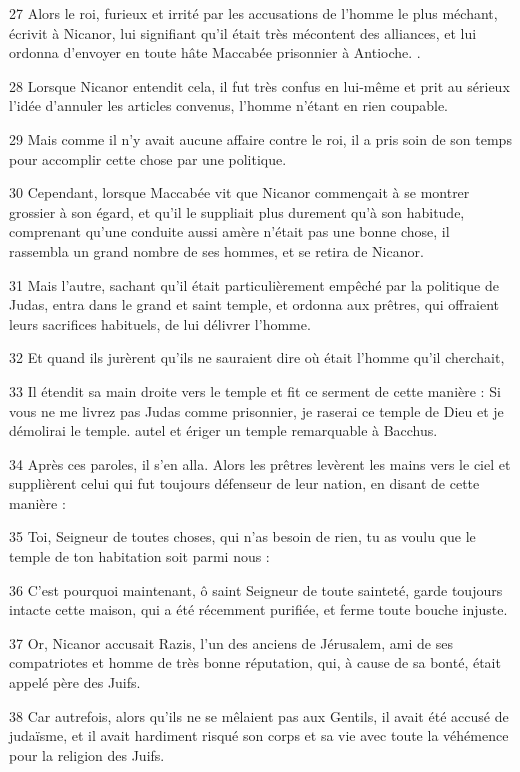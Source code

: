 \par 27 Alors le roi, furieux et irrité par les accusations de l'homme le plus méchant, écrivit à Nicanor, lui signifiant qu'il était très mécontent des alliances, et lui ordonna d'envoyer en toute hâte Maccabée prisonnier à Antioche. .
\par 28 Lorsque Nicanor entendit cela, il fut très confus en lui-même et prit au sérieux l'idée d'annuler les articles convenus, l'homme n'étant en rien coupable.
\par 29 Mais comme il n'y avait aucune affaire contre le roi, il a pris soin de son temps pour accomplir cette chose par une politique.
\par 30 Cependant, lorsque Maccabée vit que Nicanor commençait à se montrer grossier à son égard, et qu'il le suppliait plus durement qu'à son habitude, comprenant qu'une conduite aussi amère n'était pas une bonne chose, il rassembla un grand nombre de ses hommes, et se retira de Nicanor.
\par 31 Mais l'autre, sachant qu'il était particulièrement empêché par la politique de Judas, entra dans le grand et saint temple, et ordonna aux prêtres, qui offraient leurs sacrifices habituels, de lui délivrer l'homme.
\par 32 Et quand ils jurèrent qu'ils ne sauraient dire où était l'homme qu'il cherchait,
\par 33 Il étendit sa main droite vers le temple et fit ce serment de cette manière : Si vous ne me livrez pas Judas comme prisonnier, je raserai ce temple de Dieu et je démolirai le temple. autel et ériger un temple remarquable à Bacchus.
\par 34 Après ces paroles, il s'en alla. Alors les prêtres levèrent les mains vers le ciel et supplièrent celui qui fut toujours défenseur de leur nation, en disant de cette manière :
\par 35 Toi, Seigneur de toutes choses, qui n'as besoin de rien, tu as voulu que le temple de ton habitation soit parmi nous :
\par 36 C'est pourquoi maintenant, ô saint Seigneur de toute sainteté, garde toujours intacte cette maison, qui a été récemment purifiée, et ferme toute bouche injuste.
\par 37 Or, Nicanor accusait Razis, l'un des anciens de Jérusalem, ami de ses compatriotes et homme de très bonne réputation, qui, à cause de sa bonté, était appelé père des Juifs.
\par 38 Car autrefois, alors qu'ils ne se mêlaient pas aux Gentils, il avait été accusé de judaïsme, et il avait hardiment risqué son corps et sa vie avec toute la véhémence pour la religion des Juifs.
